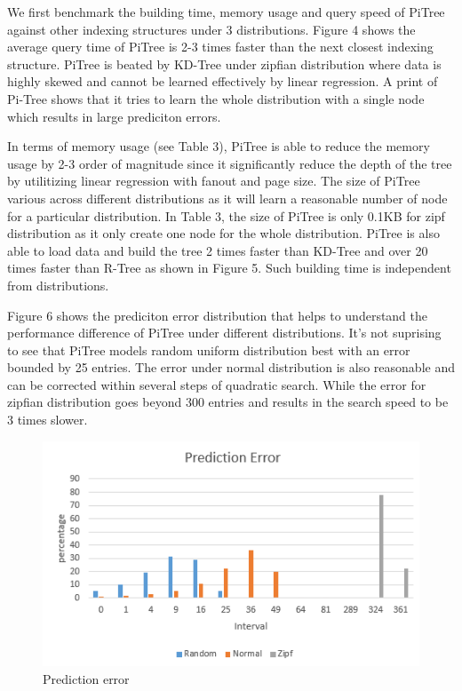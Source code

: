\documentclass[sigconf,10pt]{acmart}
\begin{document}
We first benchmark the building time, memory usage and query speed of PiTree against
other indexing structures under 3 distributions. Figure 4 shows the average query time of
PiTree is 2-3 times faster than the next closest indexing structure. PiTree is beated by
KD-Tree under zipfian distribution where data is highly skewed and cannot be learned effectively
by linear regression. A print of Pi-Tree shows that it tries to learn the whole distribution
with a single node which results in large prediciton errors.

In terms of memory usage (see Table 3), PiTree is able to reduce the memory usage by 2-3 order of magnitude
since it significantly reduce the depth of the tree by utilitizing linear regression with fanout and
page size. The size of PiTree various across different distributions as it will learn a reasonable number
of node for a particular distribution. In Table 3, the size of PiTree is only 0.1KB for zipf
distribution as it only create one node for the whole distribution. PiTree is also able to load data and build the tree 2 times faster than KD-Tree and over 20 times
faster than R-Tree as shown in Figure 5. Such building time is independent from distributions.

Figure 6 shows the prediciton error distribution that helps to understand the performance
difference of PiTree under different distributions. It's not suprising to see that PiTree
models random uniform distribution best with an error bounded by 25 entries. The error under
normal distribution is also reasonable and can be corrected within several steps of quadratic
search. While the error for zipfian distribution goes beyond 300 entries and results in the
search speed to be 3 times slower.

\begin{figure}[h]
  \includegraphics[scale=0.6]{../figures/addition/prediction-error}
  \caption{Prediction error}
  \label{prediction-error}
\end{figure}
\end{document}
